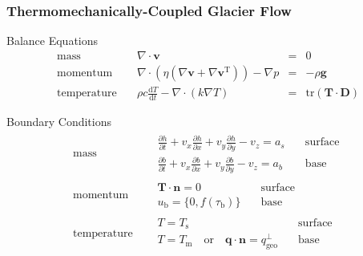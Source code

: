 \documentclass[hide notes,intlimits]{beamer}
\begin{document}
\begin{frame}
  \frametitle{Thermomechanically-Coupled Glacier Flow}
  \begin{block}{Balance Equations}
    \footnotesize{
    \begin{equation*}
      \begin{array}{lrcl}
        \text{mass} \quad &  \nabla \cdot \mathbf{v}  & = & 0\\[.25em]
        \text{momentum} \quad &  \nabla \cdot \left(\eta\left(\nabla \mathbf{v} + \nabla \mathbf{v}^{\text{T}}\right)\right)- \nabla p & = &  -\rho\mathbf{g} \\[.25em]
        \text{temperature} \quad & \rho c\frac{\text{d} T}{\text{d} t} - \nabla \cdot \left(k \nabla T\right) & = &  \text{tr} \left(\mathbf{T}\cdot\mathbf{D}\right) 
      \end{array}
    \end{equation*}
  }
  \end{block}
 \begin{block}{Boundary Conditions} 
   \footnotesize{
    \begin{equation*}
      \begin{array}{lr}
        \text{mass} \quad &  
        \begin{array}{rl}
          \frac{\partial h}{\partial t} + v_{x}\frac{\partial h}{\partial x} + v_{y}\frac{\partial h}{\partial y} - v_{z} = a_{s} & \quad \text{surface} \\[.25em]
          \frac{\partial b}{\partial t} + v_{x}\frac{\partial b}{\partial x} + v_{y}\frac{\partial b}{\partial y} - v_{z} = a_{b} & \quad \text{base}
        \end{array}
        \\[1.25em]
        \text{momentum} \quad & 
        \begin{array}{rl}
          \mathbf{T}\cdot\mathbf{n} = 0 & \quad \text{surface} \\[.25em]
         u_{\text{b}} = \{0,f(\tau_{\text{b}})\} & \quad \text{base}
        \end{array}        
        \\[1.25em]
        \text{temperature} \quad & 
        \begin{array}{rl}
          T = T_{\text{s}} & \quad \text{surface} \\[.25em]
          T = T_{\text{m}} \quad  \text{or} \quad \mathbf{q} \cdot \mathbf{n} = q_{\text{geo}}^{\perp }& \quad \text{base}
        \end{array}
      \end{array}
    \end{equation*}
  }
 \end{block}
\end{frame}
\end{document}

